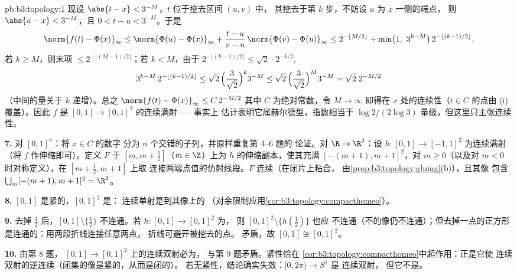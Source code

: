 \begin{solution}{pb:b3:topology:1}
现设 $\abs{t - x} < 3^{-M}$，$t$ 位于挖去区间 $(u, v)$ 中，
其挖去于第 $k$ 步，不妨设 $u$ 为 $x$ 一侧的端点，
则 $\abs{u - x} < 3^{-M}$，且 $0 < t - u < 3^{-M}$。于是
\[
\norm{f(t) - \Phi(x)}_\infty
\leq \norm{\Phi(u) - \Phi(x)}_\infty
+ \frac{t - u}{v - u}\,\norm{\Phi(v) - \Phi(u)}_\infty
\leq 2^{-\lfloor M/2\rfloor} + \min\bigl(1,\ 3^{k - M}\bigr)\,
2^{-\lfloor(k-1)/2\rfloor} .
\]
若 $k \geq M$，则末项 $\leq 2^{-\lfloor(M-1)/2
\rfloor}$；若 $k < M$，由于 $2^{-\lfloor(k-1)/2\rfloor} \leq
\sqrt2\,\cdot 2^{-k/2}$,
\[
3^{k-M}\,2^{-\lfloor(k-1)/2\rfloor}
\leq \sqrt2\,\Bigl(\frac{3}{\sqrt2}\Bigr)^{k} 3^{-M}
\leq \sqrt2\,\Bigl(\frac{3}{\sqrt2}\Bigr)^{M} 3^{-M}
= \sqrt2\; 2^{-M/2}
\]
（中间的量关于 $k$ 递增）。总之
$\norm{f(t) - \Phi(x)}_\infty \leq C\,2^{-M/2}$
其中 $C$ 为绝对常数，令 $M \to \infty$
即得在 $x$ 处的连续性（$t \in C$ 的点由 (i) 覆盖）。因此
$f$ 是 $[0,1] \to [0,1]^2$ 的连续满射——事实上
估计表明它属赫尔德型，指数相当于 $\log 2/(2\log
3)$ 量级，但这里只主张连续性。

\textbf{7.} 对 $[0,1]^n$：将 $x \in C$ 的数字
分为 $n$ 个交错的子列，并原样重复第 4--6 题的
论证。对 $\R \to \R^2$：设 $h \colon [0,1] \to [-1,1]^2$
为连续满射（将 $f$ 作伸缩即可）。定义 $F$ 于 $[m, m
+ \frac12]$（$m \in \Z$）上为 $h$ 的伸缩副本，使其充满
$[-(m+1), m+1]^2$，对 $m \geq 0$（以及对 $m <
0$ 时对称定义），在 $[m + \frac12, m + 1]$ 上取
连接两端点值的仿射线段。$F$ 连续（在闭片上粘合，
由\cref{prop:b3:topology:gluing}(b)），且其像
包含 $\bigcup_m [-(m+1), m+1]^2 = \R^2$。

\textbf{8.} $[0,1]$ 是紧的，$[0,1]^2$ 是：
连续单射是到其像上的
（对余限制应用\cref{cor:b3:topology:compacthomeo}）。

\textbf{9.} 去掉 $\frac12$ 后，$[0,1]\setminus\{\frac12\}$
不连通。若 $h \colon [0,1] \to [0,1]^2$ 为，
则 $[0,1]^2\setminus\{h(\frac12)\}$ 也应
不连通（不的像仍不连通）；但去掉一点的正方形
是连通的：用两段折线连接任意两点，
折线可避开被挖去的点。
矛盾，故 $[0,1] \not\cong [0,1]^2$。

\textbf{10.} 由第 8 题，
$[0,1] \to [0,1]^2$ 上的连续双射必为，
与第 9 题矛盾。紧性恰在
\cref{cor:b3:topology:compacthomeo}中起作用：正是它使
连续双射的逆连续（闭集的像是紧的，从而是闭的）。
若无紧性，结论确实失效：$[0, 2\pi) \to S^1$ 是
连续双射，
但它不是。


\end{solution}
